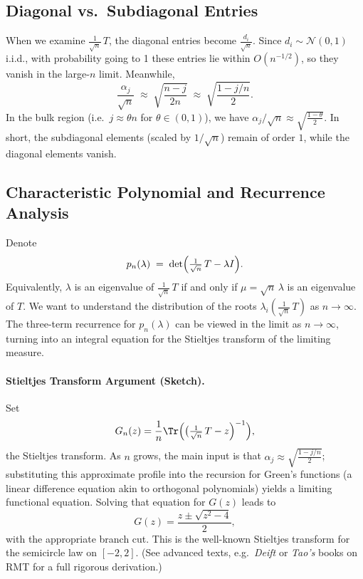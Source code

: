\documentclass[letterpaper,11pt,oneside,reqno]{article}
\numberwithin{equation}{section}
\theoremstyle{definition}
\begin{document}
\subsection{Diagonal vs.\ Subdiagonal Entries}

When we examine $\frac{1}{\sqrt{n}}\,T$, the diagonal entries become $\frac{d_i}{\sqrt{n}}$. Since $d_i \sim \mathcal{N}(0,1)$ i.i.d., with probability going to 1 these entries lie within $O(n^{-1/2})$, so they vanish in the large-$n$ limit. Meanwhile,
\[
  \frac{\alpha_j}{\sqrt{n}}
  \;\approx\;
  \sqrt{\frac{n-j}{2n}}
  \;\approx\;
  \sqrt{\frac{1 - j/n}{2}}.
\]
In the bulk region (i.e.\ $j\approx \theta n$ for $\theta\in (0,1)$), we have $\alpha_j/\sqrt{n} \approx \sqrt{\frac{1-\theta}{2}}$. In short, the subdiagonal elements (scaled by $1/\sqrt{n}$) remain of order $1$, while the diagonal elements vanish.

\subsection{Characteristic Polynomial and Recurrence Analysis}

Denote
\[
  p_n(\lambda) \;=\;
  \det\Bigl(\tfrac1{\sqrt{n}}\,T - \lambda I\Bigr).
\]
Equivalently, $\lambda$ is an eigenvalue of $\frac{1}{\sqrt{n}}\,T$ if and only if $\mu = \sqrt{n}\,\lambda$ is an eigenvalue of $T$. We want to understand the distribution of the roots $\lambda_i(\frac{1}{\sqrt{n}}\,T)$ as $n\to\infty$. The three-term recurrence for $p_n(\lambda)$ can be viewed in the limit as $n\to\infty$, turning into an integral equation for the Stieltjes transform of the limiting measure.

\paragraph{Stieltjes Transform Argument (Sketch).}
Set
\[
  G_n(z)
  = \frac{1}{n}\Tr\Bigl(\bigl(\tfrac{1}{\sqrt{n}}\,T - z\Bigr)^{-1}\Bigr),
\]
the Stieltjes transform. As $n$ grows, the main input is that $\alpha_j\approx \sqrt{\frac{1-j/n}{2}}$; substituting this approximate profile into the recursion for Green’s functions (a linear difference equation akin to orthogonal polynomials) yields a limiting functional equation. Solving that equation for $G(z)$ leads to
\[
  G(z) = \frac{z \pm \sqrt{z^2-4}}{2},
\]
with the appropriate branch cut. This is the well-known Stieltjes transform for the semicircle law on $[-2,2]$. (See advanced texts, e.g.\ \emph{Deift} or \emph{Tao’s} books on RMT for a full rigorous derivation.)
\end{document}

